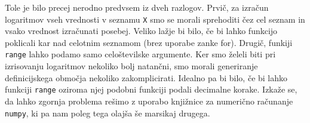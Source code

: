 Tole je bilo precej nerodno predvsem iz dveh razlogov. Prvič, za izračun logaritmov vseh vrednosti v seznamu \texttt{X} smo se morali sprehoditi čez cel seznam in vsako vrednost izračunati posebej. Veliko lažje bi bilo, če bi lahko funkcijo poklicali kar nad celotnim seznamom (brez uporabe zanke for). Drugič, funkiji \texttt{range} lahko podamo samo celoštevilske argumente. Ker smo želeli biti pri izrisovanju logaritmov nekoliko bolj natančni, smo morali generiranje definicijskega območja nekoliko zakomplicirati. Idealno pa bi bilo, če bi lahko funkciji \texttt{range} oziroma njej podobni funkciji podali decimalne korake. Izkaže se, da lahko zgornja problema rešimo z uporabo knjižnice za numerično računanje \texttt{numpy}, ki pa nam poleg tega olajša še marsikaj drugega.
